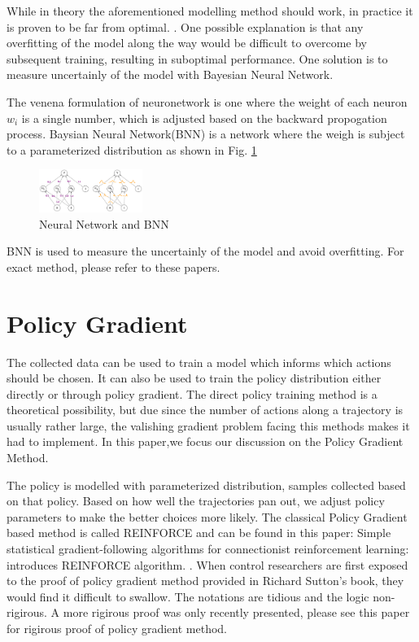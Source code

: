 \documentclass[journal]{IEEEtran}
\begin{document}
While in theory the aforementioned modelling method should work, in practice it is proven to be far from optimal.  \cite{8463189}. One possible explanation is that any overfitting of the model along the way would be difficult to overcome by subsequent training, resulting in suboptimal performance. One solution is to measure uncertainly of the model with Bayesian Neural Network.

The venena formulation of neuronetwork is one where the weight of each neuron $w_i$ is a single number, which is adjusted based on the backward propogation process. Baysian Neural Network(BNN) is a network where the weigh is subject to a parameterized distribution as shown in Fig. \ref{fig:2}
\begin{figure}[H]
    \centering
    \includegraphics[width=0.3\textwidth]{bnn.png}
    \caption{Neural Network and BNN}
    \label{fig:2}
\end{figure}


BNN is used to measure the uncertainly of the model and avoid overfitting. For exact method, please refer to these papers. \cite{Blundell2015WeightUI} \cite{Gal2017ConcreteD}

\section{Policy Gradient}
The collected data can be used to train a model which informs which actions should be chosen. It can also be used to train the policy distribution either directly or through policy gradient. The direct policy training method is a theoretical possibility, but due since the number of actions along a trajectory is usually rather large, the valishing gradient problem facing this methods makes it had to implement. In this paper,we focus our discussion on the Policy Gradient Method.

The policy is modelled with parameterized distribution, samples collected based on that policy. Based on how well the trajectories pan out, we adjust policy parameters to make the better choices more likely. The classical Policy Gradient based method is called REINFORCE and can be found in this paper: Simple statistical gradient-following algorithms for connectionist reinforcement learning: introduces REINFORCE algorithm. \cite{Williams1992SimpleSG}. When control researchers are first exposed to the proof of policy gradient method provided in Richard Sutton's book, they would find it difficult to swallow. The notations are tidious and the logic non-rigirous. A more rigirous proof was only recently presented, please see this paper for rigirous proof of policy gradient method. \cite{Schulman2015TrustRP}
\end{document}
